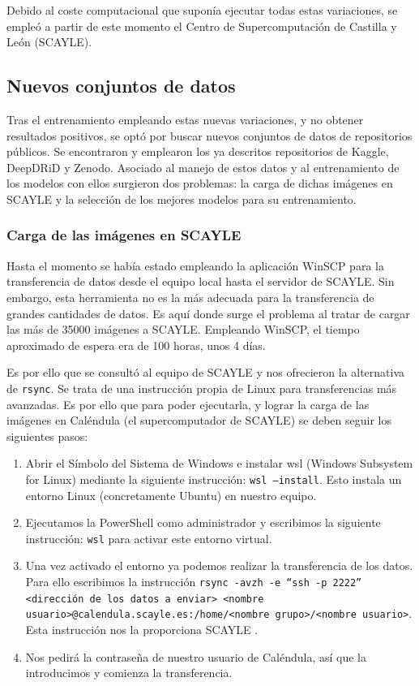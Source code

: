 Debido al coste computacional que suponía ejecutar todas estas variaciones, se empleó a partir de este momento el Centro de Supercomputación de Castilla y León (SCAYLE).

\subsection{Nuevos conjuntos de datos}

Tras el entrenamiento empleando estas nuevas variaciones, y no obtener resultados positivos, se optó por buscar nuevos conjuntos de datos de repositorios públicos. Se encontraron y emplearon los ya descritos repositorios de Kaggle, DeepDRiD y Zenodo. Asociado al manejo de estos datos y al entrenamiento de los modelos con ellos surgieron dos problemas: la carga de dichas imágenes en SCAYLE y la selección de los mejores modelos para su entrenamiento.

\subsubsection{Carga de las imágenes en SCAYLE}

Hasta el momento se había estado empleando la aplicación WinSCP para la transferencia de datos desde el equipo local hasta el servidor de SCAYLE. Sin embargo, esta herramienta no es la más adecuada para la transferencia de grandes cantidades de datos. Es aquí donde surge el problema al tratar de cargar las más de 35000 imágenes a SCAYLE. Empleando WinSCP, el tiempo aproximado de espera era de 100 horas, unos 4 días.

Es por ello que se consultó al equipo de SCAYLE y nos ofrecieron la alternativa de \texttt{rsync}. Se trata de una instrucción propia de Linux para transferencias más avanzadas. Es por ello que para poder ejecutarla, y lograr la carga de las imágenes en Caléndula (el supercomputador de SCAYLE) se deben seguir los siguientes pasos:

\begin{enumerate}
    \item Abrir el Símbolo del Sistema de Windows e instalar wsl (Windows Subsystem for Linux) mediante la siguiente instrucción: \texttt{wsl --install}. Esto instala un entorno Linux (concretamente Ubuntu) en nuestro equipo.
    \item Ejecutamos la PowerShell como administrador y escribimos la siguiente instrucción: \texttt{wsl} para activar este entorno virtual.
    \item Una vez activado el entorno ya podemos realizar la transferencia de los datos. Para ello escribimos la instrucción \texttt{rsync -avzh -e ``ssh -p 2222'' <dirección de los datos a enviar> <nombre usuario>@calendula.scayle.es:/home/<nombre grupo>/<nombre usuario>}. Esta instrucción nos la proporciona SCAYLE \cite{rsync}.
    \item Nos pedirá la contraseña de nuestro usuario de Caléndula, así que la introducimos y comienza la transferencia.
\end{enumerate}


